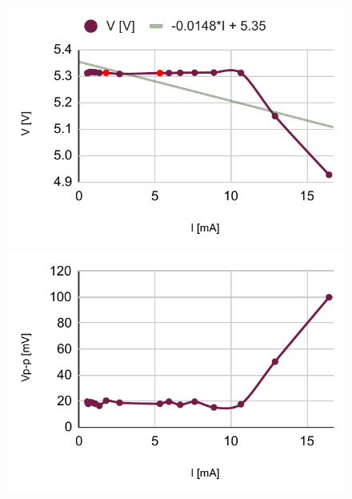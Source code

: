 \begin{figure}[H]
	\centering
	\begin{minipage}{.47\textwidth}
		\centering
		\includegraphics[width=1\linewidth]{schematics/chart1.pdf}
	\end{minipage}\qquad
	\begin{minipage}{.47\textwidth}
		\centering
		\includegraphics[width=1\linewidth]{schematics/chart2.pdf}
	\end{minipage}
	
	\bigskip
	
	\begin{minipage}[t]{.4\textwidth}
		\centering
		
		\caption{}
	\end{minipage}\qquad
	\begin{minipage}[t]{.4\textwidth}
		\centering
		\caption{}
	\end{minipage}
\end{figure}

